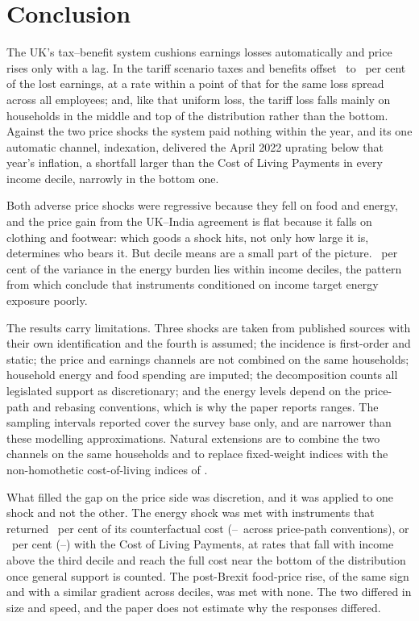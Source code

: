 \FloatBarrier
\section{Conclusion}\label{sec:discussion}

The UK's tax--benefit system cushions earnings losses automatically
and price rises only with a lag. In the tariff scenario taxes and
benefits offset \EThreeDispTaxBenRatePct\ to \EThreeWageTaxBenRatePct\
per cent of the lost earnings, at a rate within a point of that for
the same loss spread across all employees; and, like that uniform
loss, the tariff loss falls mainly on households
in the middle and top of the distribution rather than the bottom. Against the two price shocks the system paid nothing within
the year, and its one automatic channel, indexation, delivered the
April 2022 uprating below that year's inflation, a shortfall larger
than the Cost of Living Payments in every income decile, narrowly in
the bottom one.

Both adverse price shocks were regressive because they fell on food
and energy, and the price gain from the UK--India agreement is flat
because it falls on clothing and footwear: which goods a shock hits,
not only how large it is, determines who bears it. But decile means
are a small part of the picture. \SsWithinPct\ per cent of the
variance in the energy burden lies within income deciles, the pattern
from which \citet{levell2025} conclude that instruments conditioned on
income target energy exposure poorly.

The results carry limitations. Three shocks are taken from published
sources with their own identification and the fourth is assumed; the
incidence is first-order and static; the price and earnings channels
are not combined on the same households; household energy and food
spending are imputed; the decomposition counts all legislated support
as discretionary; and the energy levels depend on the price-path and
rebasing conventions, which is why the paper reports ranges. The
sampling intervals reported cover the survey base only, and are
narrower than these modelling approximations.
Natural extensions are to combine the two channels on the same
households and to replace fixed-weight indices with the non-homothetic
cost-of-living indices of \citet{hochmuth2025}.

What filled the gap on the price side was discretion, and it was
applied to one shock and not the other. The energy shock was met with
instruments that returned \SsEnergySpecificRatePct\ per cent of its
counterfactual cost
(\SsEnergySpecificRateMinPct--\SsEnergySpecificRateMaxPct\ across
price-path conventions), or \SsDiscretionaryRatePct\ per cent
(\SsFullRateMinPct--\SsFullRateMaxPct) with the Cost of Living
Payments, at rates that fall with income above the third
decile and reach the full cost near the bottom of the distribution
once general support is counted. The post-Brexit food-price rise, of
the same sign and with a similar gradient across deciles, was met with
none. The two differed in size and speed, and the paper does not
estimate why the responses differed.
\label{sec:mainend}
